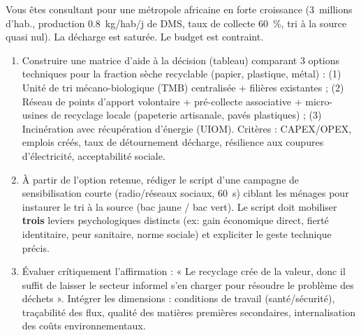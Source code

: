 \documentclass[11pt]{article}
\begin{document}
\begin{exercice}
Vous êtes consultant pour une métropole africaine en forte croissance (\SI{3}{millions} d'hab., production \SI{0.8}{kg/hab/j} de DMS, taux de collecte \SI{60}{\%}, tri à la source quasi nul). La décharge est saturée. Le budget est contraint.
\begin{enumerate}
    \item Construire une matrice d'aide à la décision (tableau) comparant 3 options techniques pour la fraction sèche recyclable (papier, plastique, métal) : (1) Unité de tri mécano-biologique (TMB) centralisée + filières existantes ; (2) Réseau de points d'apport volontaire + pré-collecte associative + micro-usines de recyclage locale (papeterie artisanale, pavés plastiques) ; (3) Incinération avec récupération d'énergie (UIOM). Critères : CAPEX/OPEX, emplois créés, taux de détournement décharge, résilience aux coupures d'électricité, acceptabilité sociale.
    \item À partir de l'option retenue, rédiger le script d'une campagne de sensibilisation courte (radio/réseaux sociaux, \SI{60}{s}) ciblant les ménages pour instaurer le tri à la source (bac jaune / bac vert). Le script doit mobiliser \textbf{trois} leviers psychologiques distincts (ex: gain économique direct, fierté identitaire, peur sanitaire, norme sociale) et expliciter le geste technique précis.
    \item Évaluer crítiquement l'affirmation : « Le recyclage crée de la valeur, donc il suffit de laisser le secteur informel s'en charger pour résoudre le problème des déchets ». Intégrer les dimensions : conditions de travail (santé/sécurité), traçabilité des flux, qualité des matières premières secondaires, internalisation des coûts environnementaux.
\end{enumerate}
\end{exercice}
\end{document}
